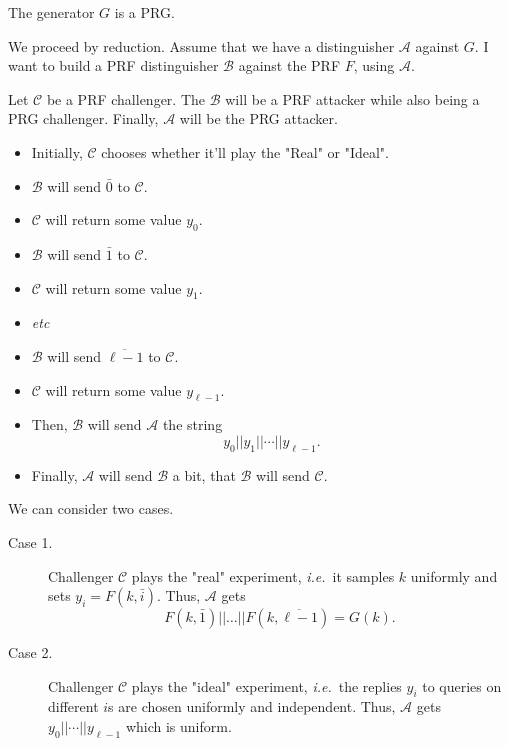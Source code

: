 \documentclass[./main]{subfiles}
\begin{document}
  \begin{lem}
    The generator $G$ is a PRG.
  \end{lem}
  \begin{prv}
    We proceed by reduction. Assume that we have a distinguisher $\mathcal{A}$ against $G$.
    I want to build a PRF distinguisher $\mathcal{B}$ against the PRF $F$, using $\mathcal{A}$.

    Let $\mathcal{C}$ be a PRF challenger.
    The $\mathcal{B}$ will be a PRF attacker while also being a PRG challenger.
    Finally, $\mathcal{A}$ will be the PRG attacker.
    \begin{itemize}
      \item Initially, $\mathcal{C}$ chooses whether it'll play the "Real" or "Ideal".
      \item $\mathcal{B}$ will send $\bar{0}$ to $\mathcal{C}$.
      \item $\mathcal{C}$ will return some value $y_0$.
      \item $\mathcal{B}$ will send $\bar{1}$ to $\mathcal{C}$.
      \item $\mathcal{C}$ will return some value $y_1$.
      \item \textit{etc}
      \item $\mathcal{B}$ will send $\overline{\ell-1}$ to $\mathcal{C}$.
      \item $\mathcal{C}$ will return some value $y_{\ell - 1}$.
      \item Then, $\mathcal{B}$ will send $\mathcal{A}$ the string
         \[
        y_0 || y_1 || \cdots  || y_{\ell-1}
        .\]
      \item Finally, $\mathcal{A}$ will send $\mathcal{B}$ a bit, that $\mathcal{B}$ will send $\mathcal{C}$.
    \end{itemize}

    We can consider two cases.
    \begin{description}
      \item[Case 1.] Challenger $\mathcal{C}$ plays the "real" experiment, \textit{i.e.}\ it samples $k$ uniformly and sets $y_i = F(k, \bar{i})$.
        Thus, $\mathcal{A}$ gets \[
          F(k, \bar{1}) || \ldots|| F(k, \overline{\ell-1}) = G(k)
        .\] 
      \item[Case 2.]
        Challenger $\mathcal{C}$ plays the "ideal" experiment, \textit{i.e.}\ the replies $y_i$ to queries on different $i$s are chosen  uniformly and independent.
        Thus, $\mathcal{A}$ gets $y_0 || \cdots  || y_{\ell- 1}$ which is uniform.
    \end{description}


\end{prv}
\end{document}
